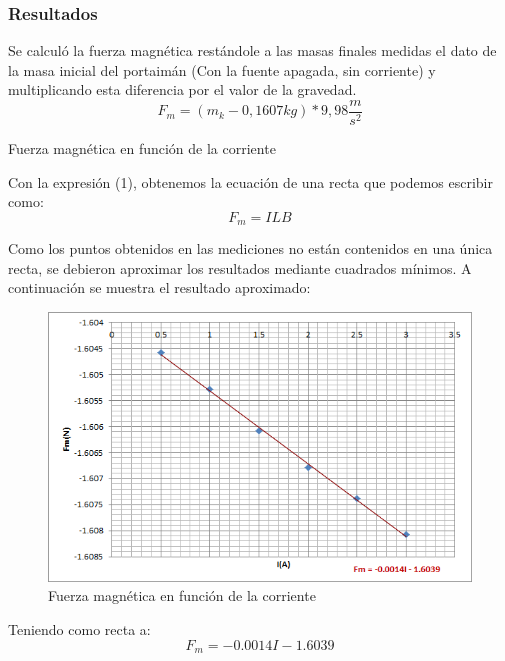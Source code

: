 \documentclass{article}
\begin{document}
\subsubsection{Resultados}
Se calculó la fuerza magnética restándole a las masas finales medidas el dato de la masa inicial del portaimán (Con la fuente apagada, sin corriente) y multiplicando esta diferencia por el valor de la gravedad.
\begin{equation}
F_m = (m_k - 0,1607kg)*9,98\frac{m}{s^2}
\end{equation}

\begin{table}[ht]
\centering

\caption{Fuerza magnética en función de la corriente}
\end{table}

Con la expresión (1), obtenemos la ecuación de una recta que podemos escribir como:
\begin{equation}
F_m = I L B 
\end{equation}

Como los puntos obtenidos en las mediciones no están contenidos en una única recta, se debieron aproximar los resultados mediante cuadrados mínimos. A 
continuación se muestra el resultado aproximado:

\begin{figure}[H]
\centering
\includegraphics[width=\columnwidth]{recta_primer_experiencia}
\caption{Fuerza magnética en función de la corriente}
\end{figure}

Teniendo como recta a:
\begin{equation}
F_{m} = -0.0014 I - 1.6039
\end{equation}
\end{document}
